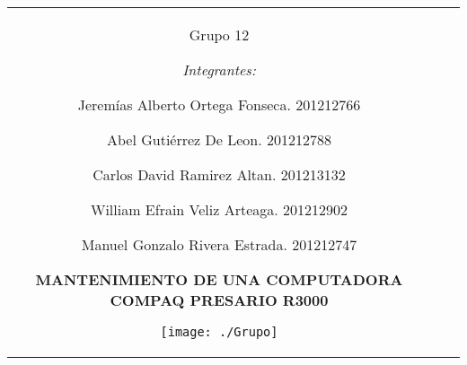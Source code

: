 \documentclass[landscape,12pt]{report}
\begin{document}
	\begin{tabular}{c c c}
			\begin{minipage}[t]{8.2cm} 
				\begin{center}
		\begin{center}
					
				   		
					 	\begin{flushleft}
					 	\Large
					 	Grupo 12
					 	
					 		\medskip
					 	\it Integrantes:
					 	
					 		\medskip
					 	 	\normalsize 
					 	 	
					 	 	
					 	 	Jerem\'ias Alberto Ortega Fonseca. 201212766
					 	 	
					 	 	Abel Guti\'errez De Leon.  201212788
					 	 	
					 	 	Carlos David Ramirez Altan. 201213132
					 	 	
					 	 	William Efrain Veliz Arteaga. 201212902
					 	 	
					 	 	Manuel Gonzalo Rivera Estrada. 201212747
					 	 	
					 	 	\end{flushleft}
					 	 	
					 	 	\medskip
					 	
				   		\medskip
				   	 	
				   	 	\medskip
				   	 	
				   	 	\medskip
				   	 	
				   	 	\medskip
				   	 	
				   	 	\medskip
				   	 	
				   	 	\medskip 	
						   	
                    \LARGE{\textbf{MANTENIMIENTO DE UNA COMPUTADORA COMPAQ PRESARIO R3000}}
				   	 	\medskip
				   	 	
				   	 	\medskip
					 	\begin{center}
							\texttt{[image: ./Grupo]}
						\end{center}
					
					 	\medskip
					 	
					 	\title{
				   	 \date{\today}
					 }
						
					\end{center}		
				
				
				\medskip
					
				\end{center}
					 

\end{minipage}
\end{tabular}
\end{document}

